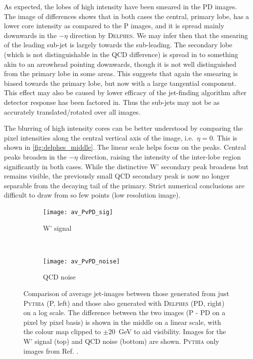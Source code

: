 \documentclass[twocolumn]{article}
\newcommand{\pkg}[1]{\textsc{#1}}
\newcommand{\delphes}{\pkg{Delphes}}
\begin{document}
As expected, the lobes of high intensity have been smeared in the PD images. The image of differences shows that in both cases the central, primary lobe, has a lower core intensity as compared to the P images, and it is spread mainly downwards in the $-\eta$ direction by \delphes. We may infer then that the smearing of the leading sub-jet is largely towards the sub-leading. The secondary lobe (which is not distinguishable in the QCD difference) is spread in to something akin to an arrowhead pointing downwards, though it is not well distinguished from the primary lobe in some areas. This suggests that again the smearing is biased towards the primary lobe, but now with a large tangential component. This effect may also be caused by lower efficacy of the jet-finding algorithm after detector response has been factored in. Thus the sub-jets may not be as accurately translated/rotated over all images.

The blurring of high intensity cores can be better understood by comparing the pixel intensities along the central vertical axis of the image, i.e.~$\eta=0$. This is shown in \cref{fig:delphes_middle}. The linear scale helps focus on the peaks. Central peaks broaden in the $-\eta$ direction, raising the intensity of the inter-lobe region significantly in both cases. While the distinctive W' secondary peak broadens but remains visible, the previously small QCD secondary peak is now no longer separable from the decaying tail of the primary. Strict numerical conclusions are difficult to draw from so few points (low resolution image).


  
\begin{figure}[!htbp]
	\centering
	\begin{subfigure}[t]{1.0\textwidth}
		\centering
		\texttt{[image: av\_PvPD\_sig]}
		\caption{W' signal}
	\end{subfigure}%
	\\
	\begin{subfigure}[t]{1.0\textwidth}
		\centering
		\texttt{[image: av\_PvPD\_noise]}
		\caption{QCD noise}
	\end{subfigure}

	\caption{Comparison of average jet-images between those generated from just \pkg{Pythia} (P, left) and those also generated with \pkg{Delphes} (PD, right) on a log scale. The difference between the two images (P - PD on a pixel by pixel basis) is shown in the middle on a linear scale, with the colour map clipped to $\pm$\SI{20}{\giga\electronvolt} to aid visibility. Images for the W' signal (top) and QCD noise (bottom) are shown. \pkg{Pythia} only images from Ref. \cite{de2017learning}. }
	\label{fig:delphes_ims}
\end{figure}
\end{document}
